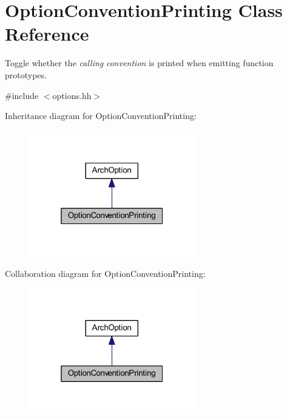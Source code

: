 \hypertarget{class_option_convention_printing}{}\section{Option\+Convention\+Printing Class Reference}
\label{class_option_convention_printing}


Toggle whether the {\itshape calling} {\itshape convention} is printed when emitting function prototypes.  




{\ttfamily \#include $<$options.\+hh$>$}



Inheritance diagram for Option\+Convention\+Printing\+:
\nopagebreak
\begin{figure}[H]
\begin{center}
\leavevmode
\includegraphics[width=205pt]{class_option_convention_printing__inherit__graph}
\end{center}
\end{figure}


Collaboration diagram for Option\+Convention\+Printing\+:
\nopagebreak
\begin{figure}[H]
\begin{center}
\leavevmode
\includegraphics[width=205pt]{class_option_convention_printing__coll__graph}
\end{center}
\end{figure}
